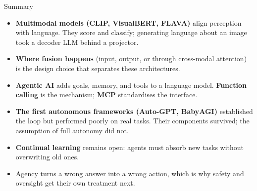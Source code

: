 \begin{frame}{Summary}
  \begin{itemize}
    \item[\textcolor{red}{$\blacktriangleright$}] \textbf{Multimodal models (CLIP, VisualBERT, FLAVA)} align
      perception with language. They score and classify; generating language about an image took a decoder
      LLM behind a projector.
    \item[\textcolor{red}{$\blacktriangleright$}] \textbf{Where fusion happens} (input, output, or through
      cross-modal attention) is the design choice that separates these architectures.
    \item[\textcolor{red}{$\blacktriangleright$}] \textbf{Agentic AI} adds goals, memory, and tools to a
      language model. \textbf{Function calling} is the mechanism; \textbf{MCP} standardises the interface.
    \item[\textcolor{red}{$\blacktriangleright$}] \textbf{The first autonomous frameworks (Auto-GPT, BabyAGI)}
      established the loop but performed poorly on real tasks. Their components survived; the assumption of
      full autonomy did not.
    \item[\textcolor{red}{$\blacktriangleright$}] \textbf{Continual learning} remains open: agents must absorb
      new tasks without overwriting old ones.
    \item[\textcolor{red}{$\blacktriangleright$}] Agency turns a wrong answer into a wrong action, which is why
      safety and oversight get their own treatment next.
  \end{itemize}
\end{frame}
